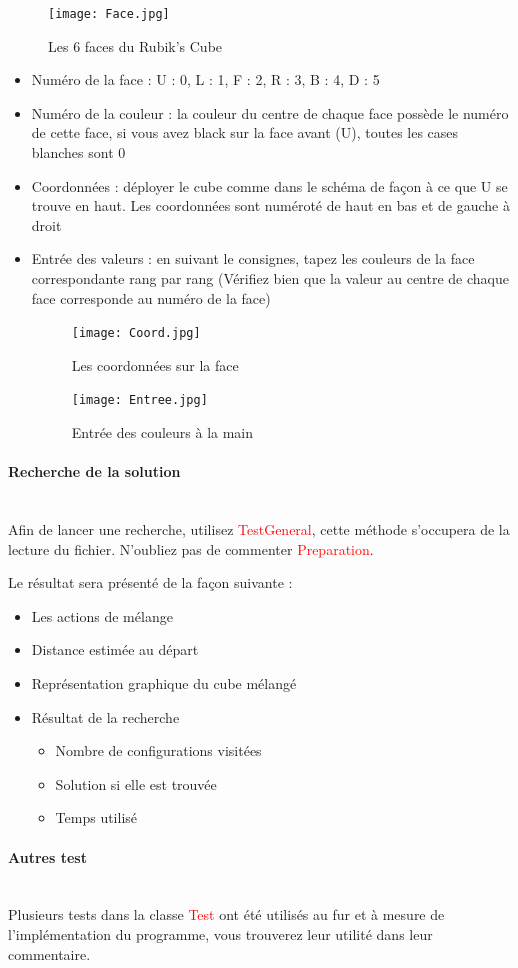 \documentclass[fleqn,10pt,french]{SelfArx} %
\newcommand{\class}[1]{\colorbox{bg}{\textcolor{red}{\usefont{OT1}{cmtt}{m}{n}#1}}}
\begin{document}
\begin{figure}[h]
\centering 
\texttt{[image: Face.jpg]}
\caption{Les 6 faces du Rubik’s Cube}
\end{figure}

\begin{itemize}[noitemsep] %
\item Numéro de la face : 
U : 0, L : 1, F : 2, R : 3, B : 4, D : 5
\item Numéro de la couleur : la couleur du centre de chaque face possède le numéro de cette face, si vous avez black sur la face avant (U), toutes les cases blanches sont 0
\item Coordonnées : déployer le cube comme dans le schéma de façon à ce que U se trouve en haut. Les coordonnées sont numéroté de haut en bas et de gauche à droit 
\item Entrée des valeurs : en suivant le consignes, tapez les couleurs de la face correspondante rang par rang (Vérifiez bien que la valeur au centre de chaque face corresponde au numéro de la face)
\begin{figure}[h]
\centering 
\texttt{[image: Coord.jpg]}
\caption{Les coordonnées sur la face}
\end{figure}
\begin{figure}[h]
\centering 
\texttt{[image: Entree.jpg]}
\newline 
\caption{Entrée des couleurs à la main}
\end{figure}
\end{itemize}

\paragraph{Recherche de la solution}
~\\\indent
Afin de lancer une recherche, utilisez \class{TestGeneral}, cette méthode s’occupera de la lecture du fichier. N’oubliez pas de commenter \class{Preparation}.

Le résultat sera présenté de la façon suivante : 

\begin{itemize}[noitemsep] %
\item Les actions de mélange
\item Distance estimée au départ
\item Représentation graphique du cube mélangé
\item Résultat de la recherche
\begin{itemize}[noitemsep] %
\item Nombre de configurations visitées
\item Solution si elle est trouvée
\item Temps utilisé
\end{itemize}
\end{itemize}

\paragraph{Autres test}
~\\\indent
Plusieurs tests dans la classe \class{Test} ont été utilisés au fur et à mesure de l’implémentation du programme, vous trouverez leur utilité dans leur commentaire.
\end{document}

